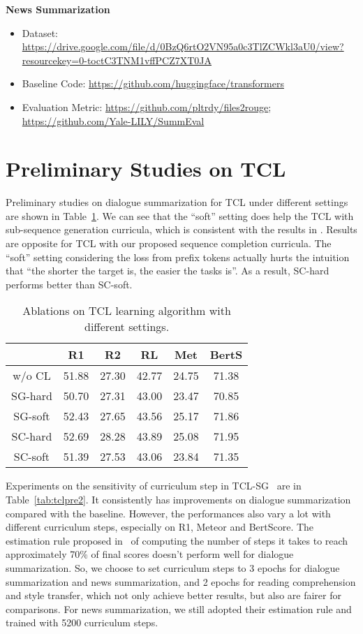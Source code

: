 \textbf{News Summarization}
\begin{itemize}
	\item Dataset: \url{https://drive.google.com/file/d/0BzQ6rtO2VN95a0c3TlZCWkl3aU0/view?resourcekey=0-toctC3TNM1vffPCZ7XT0JA}
	\item Baseline Code: \url{https://github.com/huggingface/transformers}
	\item Evaluation Metric: \url{https://github.com/pltrdy/files2rouge}; \url{https://github.com/Yale-LILY/SummEval}
\end{itemize}

\section{Preliminary Studies on TCL}
\label{sec:preliminary}

Preliminary studies on dialogue summarization for TCL under different settings are shown in Table~\ref{tab:tclpre}.
We can see that the ``soft'' setting does help the TCL with sub-sequence generation curricula, which is consistent with the results in \citet{liang-etal-2021-token-wise}.
Results are opposite for TCL with our proposed sequence completion curricula. The ``soft'' setting considering the loss from prefix tokens actually hurts the intuition that ``the shorter the target is, the easier the tasks is''.  As a result, SC-hard performs better than SC-soft.


\begin{table}[th]
	\scriptsize
	\centering
	\begin{tabular}{cccccc}
		\hline
		{} & {R1} & {R2} & {RL} & {Met} & {BertS} \\
		\hline
		w/o CL& 51.88 & 27.30 & 42.77 & 24.75 & 71.38 \\
		\hline
		SG-hard &50.70 & 27.31 & 43.00 & 23.47 & 70.85\\
		SG-soft & 52.43 & 27.65 & 43.56 & 25.17 & 71.86 \\
		\hline
		SC-hard &  52.69 & 28.28 & 43.89 & 25.08 & 71.95 \\
		SC-soft & 51.39 & 27.53 & 43.06 & 23.84 & 71.35 \\
		\hline
	\end{tabular}
	\caption{Ablations on TCL learning algorithm with different settings.}
	\label{tab:tclpre}
\end{table} 

Experiments on the sensitivity of curriculum step in TCL-SG~\cite{liang-etal-2021-token-wise} are in Table~\ref{tab:tclpre2}. 
It consistently has improvements on dialogue summarization compared with the baseline. However, the performances also vary a lot with different curriculum steps, especially on R1, Meteor and BertScore. The estimation rule proposed in~\citet{liang-etal-2021-token-wise} of computing the number of steps it takes to reach approximately 70\% of final scores doesn't perform well for dialogue summarization. So, we choose to set curriculum steps to 3 epochs for dialogue summarization and news summarization, and 2 epochs for reading comprehension and style transfer, which not only achieve better results, but also are fairer for comparisons. For news summarization, we still adopted their estimation rule and trained with 5200 curriculum steps.

